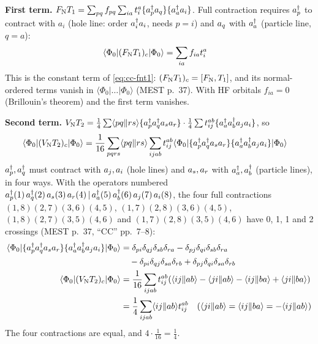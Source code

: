 \textbf{First term.} $F_{\mathrm{N}}  T_1 = \sum_{pq} f_{pq} \sum_{ia} t_i^a \{a^{\dagger}_{p} a_{q}\} \{a^{\dagger}_{a} a_{i}\}$. Full contraction requires $a^{\dagger}_{p}$ to contract with $a_i$ (hole line: order $a^{\dagger}_{i} a_{i}$, needs $p = i$) and $a_{q}$ with $a^{\dagger}_{a}$ (particle line, $q = a$):
\begin{align*}
\langle \Phi_0|(F_{\mathrm{N}}  T_1)_c|\Phi_0\rangle &= \sum_{ia} f_{ia} t_i^a
\end{align*}
This is the constant term of \eqref{eq:cc-fnt1}: $(F_{\mathrm{N}} T_1)_c = [F_{\mathrm{N}}, T_1]$, and its normal-ordered terms vanish in $\langle \Phi_0|\dots|\Phi_0\rangle$ (MEST p.~37). With HF orbitals $f_{ia} = 0$ (Brillouin's theorem) and the first term vanishes.

\textbf{Second term.} $V_{\mathrm{N}}  T_2 = \frac{1}{4} \sum \langle pq\Vert rs\rangle \{a^{\dagger}_{p} a^{\dagger}_{q} a_{s} a_{r}\} \cdot \frac{1}{4} \sum t_{ij}^{ab} \{a^{\dagger}_{a} a^{\dagger}_{b} a_{j} a_{i}\}$, so
\begin{align*}
\langle \Phi_0|(V_{\mathrm{N}}  T_2)_c|\Phi_0\rangle &= \frac{1}{16} \sum_{pqrs} \langle pq\Vert rs\rangle \sum_{ijab} t_{ij}^{ab} \langle \Phi_0|\{a^{\dagger}_{p} a^{\dagger}_{q} a_{s} a_{r}\} \{a^{\dagger}_{a} a^{\dagger}_{b} a_{j} a_{i}\}|\Phi_0\rangle
\end{align*}
$a^{\dagger}_{p}, a^{\dagger}_{q}$ must contract with $a_{j}, a_{i}$ (hole lines) and $a_{s}, a_{r}$ with $a^{\dagger}_{a}, a^{\dagger}_{b}$ (particle lines), in four ways. With the operators numbered $a^{\dagger}_{p} (1)\, a^{\dagger}_{q} (2)\, a_{s} (3)\, a_{r} (4)\allowbreak\, |\, a^{\dagger}_{a} (5)\, a^{\dagger}_{b} (6)\, a_{j} (7)\, a_{i} (8)$, the four full contractions $(1,8)(2,7)(3,6)(4,5)$, $(1,7)(2,8)(3,6)(4,5)$, $(1,8)(2,7)(3,5)(4,6)$ and $(1,7)(2,8)(3,5)(4,6)$ have 0, 1, 1 and 2 crossings (MEST p.~37, “CC” pp.~7--8):
\begin{align*}
\langle \Phi_0|\{a^{\dagger}_{p} a^{\dagger}_{q} a_{s} a_{r}\} \{a^{\dagger}_{a} a^{\dagger}_{b} a_{j} a_{i}\}|\Phi_0\rangle &= \delta_{pi} \delta_{qj} \delta_{sb} \delta_{ra} - \delta_{pj} \delta_{qi} \delta_{sb} \delta_{ra} \\
&\quad - \delta_{pi} \delta_{qj} \delta_{sa} \delta_{rb} + \delta_{pj} \delta_{qi} \delta_{sa} \delta_{rb} \\
\langle \Phi_0|(V_{\mathrm{N}}  T_2)_c|\Phi_0\rangle &= \frac{1}{16} \sum_{ijab} t_{ij}^{ab} (\langle ij\Vert ab\rangle - \langle ji\Vert ab\rangle - \langle ij\Vert ba\rangle + \langle ji\Vert ba\rangle) \\
&= \frac{1}{4} \sum_{ijab} \langle ij\Vert ab\rangle t_{ij}^{ab} \quad\text{($\langle ji\Vert ab\rangle = \langle ij\Vert ba\rangle = -\langle ij\Vert ab\rangle$)}
\end{align*}
The four contractions are equal, and $4 \cdot \frac{1}{16} = \frac{1}{4}$.


